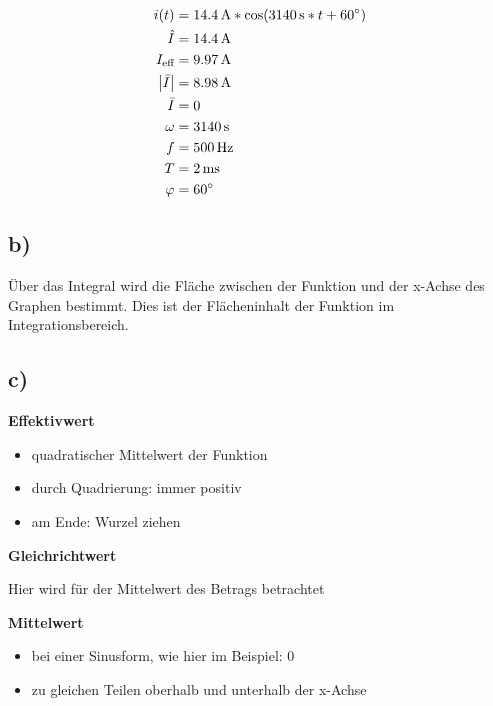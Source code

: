 \documentclass[../../document.tex]{subfiles}
\begin{document}
\begin{equation*}
    \begin{split}
        i(t) &= \SI{14,4}{\ampere} * \cos(\SI{3140}{\second} * t + \SI{60}{\degree})\\
        \hat{I} &= \SI{14,4}{\ampere}\\
        I_{\textrm{eff}} &= \SI{9,97}{\ampere}\\
        \left\lvert\bar{I}\right\rvert &= \SI{8,98}{\ampere}\\
        \bar{I} &= 0\\
        \omega &= \SI{3140}{\second}\\
        f &= \SI{500}{\hertz}\\
        T &= \SI{2}{ms}\\
        \varphi &= \SI{60}{\degree}\\
    \end{split}
\end{equation*}

\newpage

\subsection*{b)}

Über das Integral wird die Fläche zwischen der Funktion und der x-Achse des Graphen bestimmt. 
Dies ist der Flächeninhalt der Funktion im Integrationsbereich.

\subsection*{c)}

\textbf{Effektivwert}

\begin{itemize}
    \item quadratischer Mittelwert der Funktion
    \item durch Quadrierung: immer positiv
    \item am Ende: Wurzel ziehen
\end{itemize}

\textbf{Gleichrichtwert}

Hier wird für der Mittelwert des Betrags betrachtet

\textbf{Mittelwert}

\begin{itemize}
    \item bei einer Sinusform, wie hier im Beispiel: 0
    \item zu gleichen Teilen oberhalb und unterhalb der x-Achse
\end{itemize}
\end{document}
